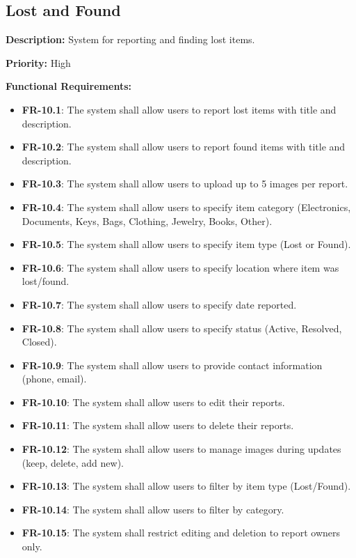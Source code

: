 \documentclass[12pt,a4paper]{article}
\begin{document}
\subsection{Lost and Found}
\textbf{Description:} System for reporting and finding lost items.

\textbf{Priority:} High

\textbf{Functional Requirements:}

\begin{itemize}
    \item \textbf{FR-10.1}: The system shall allow users to report lost items with title and description.
    \item \textbf{FR-10.2}: The system shall allow users to report found items with title and description.
    \item \textbf{FR-10.3}: The system shall allow users to upload up to 5 images per report.
    \item \textbf{FR-10.4}: The system shall allow users to specify item category (Electronics, Documents, Keys, Bags, Clothing, Jewelry, Books, Other).
    \item \textbf{FR-10.5}: The system shall allow users to specify item type (Lost or Found).
    \item \textbf{FR-10.6}: The system shall allow users to specify location where item was lost/found.
    \item \textbf{FR-10.7}: The system shall allow users to specify date reported.
    \item \textbf{FR-10.8}: The system shall allow users to specify status (Active, Resolved, Closed).
    \item \textbf{FR-10.9}: The system shall allow users to provide contact information (phone, email).
    \item \textbf{FR-10.10}: The system shall allow users to edit their reports.
    \item \textbf{FR-10.11}: The system shall allow users to delete their reports.
    \item \textbf{FR-10.12}: The system shall allow users to manage images during updates (keep, delete, add new).
    \item \textbf{FR-10.13}: The system shall allow users to filter by item type (Lost/Found).
    \item \textbf{FR-10.14}: The system shall allow users to filter by category.
    \item \textbf{FR-10.15}: The system shall restrict editing and deletion to report owners only.
\end{itemize}
\end{document}
